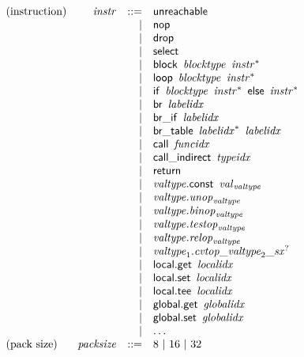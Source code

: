 $$
\begin{array}{@{}lrrl@{}l@{}}
\mbox{(instruction)} & {\mathit{instr}} &::=& \mathsf{unreachable} \\ &&|&
\mathsf{nop} \\ &&|&
\mathsf{drop} \\ &&|&
\mathsf{select} \\ &&|&
\mathsf{block}~\,{\mathit{blocktype}}~\,{{\mathit{instr}}^\ast} \\ &&|&
\mathsf{loop}~\,{\mathit{blocktype}}~\,{{\mathit{instr}}^\ast} \\ &&|&
\mathsf{if}~\,{\mathit{blocktype}}~\,{{\mathit{instr}}^\ast}~\,\mathsf{else}~\,{{\mathit{instr}}^\ast} \\ &&|&
\mathsf{br}~\,{\mathit{labelidx}} \\ &&|&
\mathsf{br\_if}~\,{\mathit{labelidx}} \\ &&|&
\mathsf{br\_table}~\,{{\mathit{labelidx}}^\ast}~\,{\mathit{labelidx}} \\ &&|&
\mathsf{call}~\,{\mathit{funcidx}} \\ &&|&
\mathsf{call\_indirect}~\,{\mathit{typeidx}} \\ &&|&
\mathsf{return} \\ &&|&
{\mathit{valtype}}.\mathsf{const}~\,{{\mathit{val}}}_{{\mathit{valtype}}} \\ &&|&
{\mathit{valtype}} . {{\mathit{unop}}}_{{\mathit{valtype}}} \\ &&|&
{\mathit{valtype}} . {{\mathit{binop}}}_{{\mathit{valtype}}} \\ &&|&
{\mathit{valtype}} . {{\mathit{testop}}}_{{\mathit{valtype}}} \\ &&|&
{\mathit{valtype}} . {{\mathit{relop}}}_{{\mathit{valtype}}} \\ &&|&
{\mathit{valtype}}_{{1}} . {{{{{\mathit{cvtop}}}{\mathsf{\_}}}{{\mathit{valtype}}_{{2}}}}{\mathsf{\_}}}{{{\mathit{sx}}^?}} \\ &&|&
\mathsf{local.get}~\,{\mathit{localidx}} \\ &&|&
\mathsf{local.set}~\,{\mathit{localidx}} \\ &&|&
\mathsf{local.tee}~\,{\mathit{localidx}} \\ &&|&
\mathsf{global.get}~\,{\mathit{globalidx}} \\ &&|&
\mathsf{global.set}~\,{\mathit{globalidx}} \\ &&|&
\dots \\
\mbox{(pack size)} & {\mathit{packsize}} &::=& 8 ~|~ 16 ~|~ 32 \\

\end{array}$$
